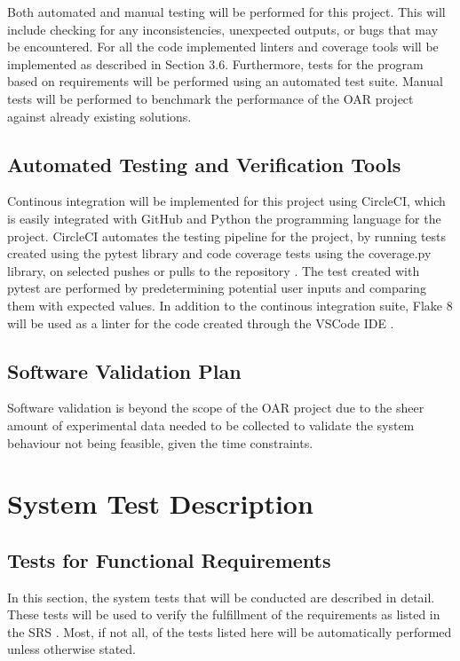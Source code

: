 \documentclass[12pt, titlepage]{article}
\begin{document}
Both automated and manual testing will be performed for this project. This will include checking for any inconsistencies,
unexpected outputs, or bugs that may be encountered.
For all the code implemented linters and coverage tools will be implemented as described in Section 3.6. Furthermore,
tests for the program based on requirements will be performed using an automated test suite. Manual tests will be 
performed to benchmark the performance of the OAR project against already existing solutions.


\subsection{Automated Testing and Verification Tools}

Continous integration will be implemented for this project using CircleCI, which 
is easily integrated with GitHub and Python the programming language for the project. CircleCI automates the testing 
pipeline for the project, by running tests created using the pytest library and code coverage tests using the coverage.py library, 
on selected pushes or pulls to the repository \citep{CircleCI}. The test created with pytest are performed by predetermining potential user
inputs and comparing them with expected values. In addition to the continous integration suite, Flake 8 will be used as a 
linter for the code created through the VSCode IDE \citep{Flake8}.

\subsection{Software Validation Plan}

Software validation is beyond the scope of the OAR project due to the sheer amount of experimental data needed to be collected to 
validate the system behaviour not being feasible, given the time constraints.

\section{System Test Description}
	
\subsection{Tests for Functional Requirements}

In this section, the system tests that will be conducted are described in detail. These tests
will be used to verify the fulfillment of the requirements as listed in the SRS \citep{SRS}.
Most, if not all, of the tests listed here will be automatically performed unless otherwise stated.
\end{document}
